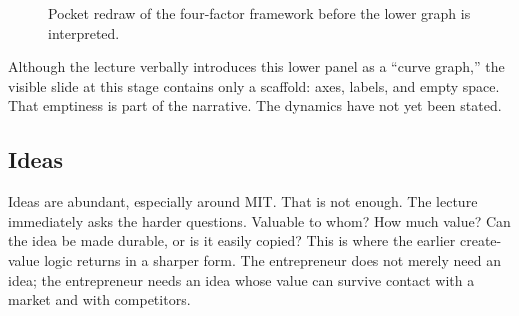 \begin{figure}[H]
\centering
{}
\caption{Pocket redraw of the four-factor framework before the lower graph is interpreted.}
\end{figure}

\begin{remark}
Although the lecture verbally introduces this lower panel as a ``curve graph,'' the visible slide at this stage contains only a scaffold: axes, labels, and empty space. That emptiness is part of the narrative. The dynamics have not yet been stated.
\end{remark}

\subsection{Ideas}

Ideas are abundant, especially around MIT. That is not enough. The lecture immediately asks the harder questions. Valuable to whom? How much value? Can the idea be made durable, or is it easily copied? This is where the earlier create-value logic returns in a sharper form. The entrepreneur does not merely need an idea; the entrepreneur needs an idea whose value can survive contact with a market and with competitors.

